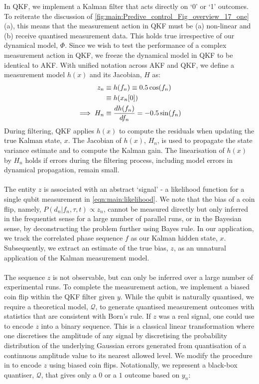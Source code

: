 In QKF, we implement a Kalman filter that acts directly on `0' or `1' outcomes. To reiterate the discussion of  \cref{fig:main:Predive_control_Fig_overview_17_one}(a), this means that the measurement action in QKF must be (a) non-linear and (b) receive quantised measurement data. This holds true irrespective of our dynamical model, $\Phi$.  Since we wish to test the performance of a complex measurement action in QKF, we freeze the dynamical model in QKF to be identical to AKF. With unified notation across AKF and QKF, we define a measurement model $h(x)$ and its Jacobian, $H$ as:
\begin{align}
z_n &  \equiv h(f_n) \equiv 0.5\cos(f_{n}) \\
& \equiv h(x_n[0]) \\
\implies H_n &\equiv \frac{d h(f_n)}{df_n} =  -0.5\sin(f_{n})
\end{align}
During filtering, QKF applies $h(x)$ to compute the residuals when updating the true Kalman state, $x$. The Jacobian of $h(x)$, $H_n$, is used to propagate the state variance estimate and to compute the Kalman gain. The linearisation of $h(x)$ by $H_n$ holds if errors during the filtering process, including model errors in dynamical propagation, remain small. 
\\
\\
The entity $z$ is associated with an abstract `signal' - a likelihood function for a single qubit measurement in \cref{eqn:main:likelihood}. We note that the bias of a coin flip, namely, $ P(d_n|f_n, \tau, t) \propto z_n$, cannot be measured directly but only inferred in the frequentist sense for a large number of parallel runs, or in the Bayesian sense, by deconstructing the problem further using Bayes rule. In our application, we track  the correlated phase sequence $f$ as our Kalman hidden state, $x$. Subsequently, we extract an estimate of the true bias, $z$, as an unnatural application of the Kalman measurement model.  
\\
\\
The sequence $z$ is not observable, but can only be inferred over a large number of experimental runs. To complete the measurement action, we implement a biased coin flip within the QKF filter given $y$.   While the qubit is naturally quantised, we require a theoretical model, $\mathcal{Q}$, to generate quantised measurement outcomes with statistics that are consistent with Born's rule. If $z$ was a real signal, one could use \cite{karlsson2005,widrow1996} to encode $z$ into a binary sequence. This is a classical linear transformation where one discretises the amplitude of any signal by discretising the probability distribution of the underlying Gaussian errors generated from quantisation of a continuous amplitude value to its nearest allowed level. We modify the procedure in \cite{karlsson2005} to encode $z$ using biased coin flips. Notationally, we represent a black-box quantiser, $\mathcal{Q}$, that gives only a $0$ or a $1$ outcome based on $y_n$:
